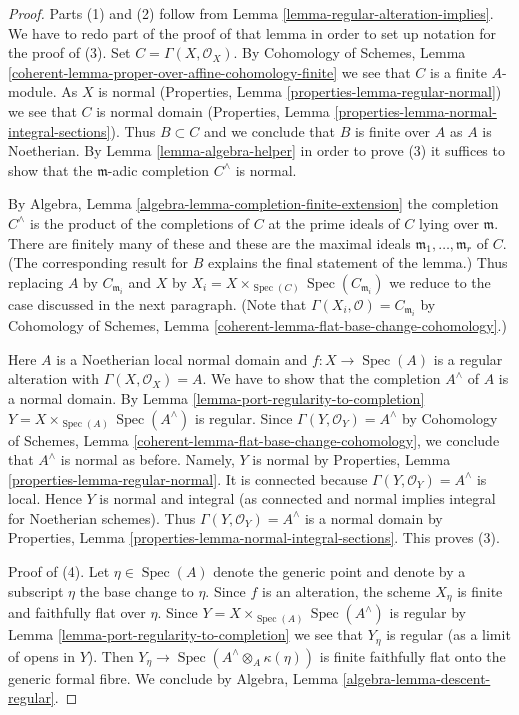 \documentclass{stacks-project}
\theoremstyle{plain}
\theoremstyle{definition}
\theoremstyle{remark}
\numberwithin{equation}{subsection}
\def\Spec{\mathop{\mathrm{Spec}}}
\begin{document}
\begin{proof}
Parts (1) and (2) follow from Lemma \ref{lemma-regular-alteration-implies}.
We have to redo part of the proof of that lemma in order to set up notation
for the proof of (3). Set $C = \Gamma(X, \mathcal{O}_X)$. By
Cohomology of Schemes, Lemma
\ref{coherent-lemma-proper-over-affine-cohomology-finite}
we see that $C$ is a finite $A$-module. As $X$ is normal
(Properties, Lemma \ref{properties-lemma-regular-normal})
we see that $C$ is normal domain
(Properties, Lemma \ref{properties-lemma-normal-integral-sections}).
Thus $B \subset C$ and we conclude that $B$ is finite over $A$
as $A$ is Noetherian. By Lemma \ref{lemma-algebra-helper}
in order to prove (3) it suffices to show
that the $\mathfrak m$-adic completion $C^\wedge$ is normal.

\medskip\noindent
By Algebra, Lemma \ref{algebra-lemma-completion-finite-extension}
the completion $C^\wedge$ is the product of the completions of
$C$ at the prime ideals of $C$ lying over $\mathfrak m$.
There are finitely many of these and these are the maximal
ideals $\mathfrak m_1, \ldots, \mathfrak m_r$ of $C$.
(The corresponding result for $B$ explains the final statement of the lemma.)
Thus replacing $A$ by $C_{\mathfrak m_i}$ and $X$ by
$X_i = X \times_{\Spec(C)} \Spec(C_{\mathfrak m_i})$
we reduce to the case discussed in the next paragraph.
(Note that $\Gamma(X_i, \mathcal{O}) = C_{\mathfrak m_i}$ by
Cohomology of Schemes, Lemma \ref{coherent-lemma-flat-base-change-cohomology}.)

\medskip\noindent
Here $A$ is a Noetherian local normal domain and $f : X \to \Spec(A)$ is a
regular alteration with $\Gamma(X, \mathcal{O}_X) = A$.
We have to show that the completion $A^\wedge$
of $A$ is a normal domain. By
Lemma \ref{lemma-port-regularity-to-completion}
$Y = X \times_{\Spec(A)} \Spec(A^\wedge)$ is regular.
Since $\Gamma(Y, \mathcal{O}_Y) = A^\wedge$ by
Cohomology of Schemes, Lemma \ref{coherent-lemma-flat-base-change-cohomology},
we conclude that $A^\wedge$ is normal as before.
Namely, $Y$ is normal by
Properties, Lemma \ref{properties-lemma-regular-normal}.
It is connected because $\Gamma(Y, \mathcal{O}_Y) = A^\wedge$ is local.
Hence $Y$ is normal and integral (as connected and normal
implies integral for Noetherian schemes). Thus
$\Gamma(Y, \mathcal{O}_Y) = A^\wedge$
is a normal domain by
Properties, Lemma \ref{properties-lemma-normal-integral-sections}.
This proves (3).

\medskip\noindent
Proof of (4). Let $\eta \in \Spec(A)$ denote the generic point
and denote by a subscript $\eta$ the base change to $\eta$.
Since $f$ is an alteration, the scheme $X_\eta$ is finite and
faithfully flat over $\eta$. Since $Y = X \times_{\Spec(A)} \Spec(A^\wedge)$
is regular by Lemma \ref{lemma-port-regularity-to-completion}
we see that $Y_\eta$ is regular (as a limit of opens in $Y$).
Then $Y_\eta \to \Spec(A^\wedge \otimes_A \kappa(\eta))$ is finite
faithfully flat onto the generic formal fibre. We conclude by
Algebra, Lemma \ref{algebra-lemma-descent-regular}.
\end{proof}
\end{document}

